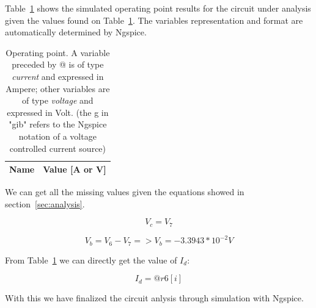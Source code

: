 Table~\ref{tab:op} shows the simulated operating point results for the circuit
under analysis given the values found on Table~\ref{tab:op}. The variables representation and format are automatically determined by Ngspice.

\begin{table}[!ht]
  \centering
  \begin{tabular}{|l|r|}
    \hline    
    {\bf Name} & {\bf Value [A or V]} \\ \hline
    
  \end{tabular}
  \caption{Operating point. A variable preceded by @ is of type {\em current}
    and expressed in Ampere; other variables are of type {\it voltage} and expressed in
    Volt. (the g in "gib" refers to the Ngspice notation of a voltage controlled current source)}
  \label{tab:op}
\end{table}

We can get all the missing values given the equations showed in section~\ref{sec:analysis}.

\begin{equation}
  V_c = V_7
  \label{eq:1}
\end{equation}

\begin{equation}
  V_b = V_6 - V_7
  => V_b = -3.3943*10^{-2} V
\end{equation}

From Table~\ref{tab:op} we can directly get the value of $I_d$:

\begin{equation}
  I_d = @r6[i]
\end{equation}

With this we have finalized the circuit anlysis through simulation with Ngspice.












